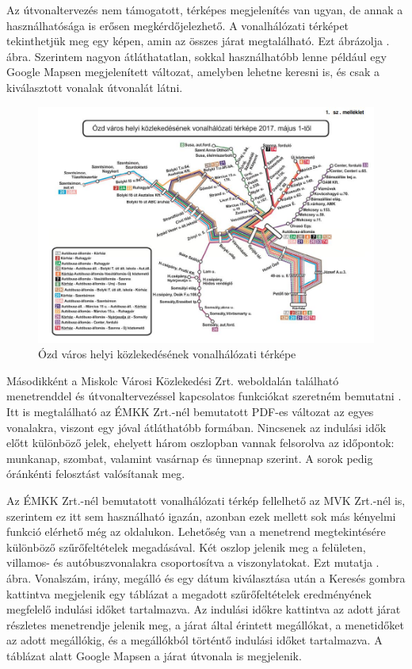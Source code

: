 Az útvonaltervezés nem támogatott, térképes megjelenítés van ugyan, de annak a használhatósága is erősen megkérdőjelezhető. A vonalhálózati térképet tekinthetjük meg egy képen, amin az összes járat megtalálható. Ezt ábrázolja . ábra. Szerintem nagyon átláthatatlan, sokkal használhatóbb lenne például egy Google Mapsen megjelenített változat, amelyben lehetne keresni is, és csak a kiválasztott vonalak útvonalát látni.

\begin{figure}[h!]
\centering
\includegraphics[scale=0.6]{kepek/EMKK_vonalhalozat.jpg}
\caption{Ózd város helyi közlekedésének vonalhálózati térképe}
\label{fig:EMKK_vonalhalozat}
\end{figure}

Másodikként a Miskolc Városi Közlekedési Zrt. weboldalán található menetrenddel és útvonaltervezéssel kapcsolatos funkciókat szeretném bemutatni \cite{mvk}. Itt is megtalálható az ÉMKK Zrt.-nél bemutatott PDF-es változat az egyes vonalakra, viszont egy jóval átláthatóbb formában. Nincsenek az indulási idők előtt különböző jelek, ehelyett három oszlopban vannak felsorolva az időpontok: munkanap, szombat, valamint vasárnap és ünnepnap szerint. A sorok pedig óránkénti felosztást valósítanak meg.

Az ÉMKK Zrt.-nél bemutatott vonalhálózati térkép fellelhető az MVK Zrt.-nél is, szerintem ez itt sem használható igazán, azonban ezek mellett sok más kényelmi funkció elérhető még az oldalukon. Lehetőség van a menetrend megtekintésére különböző szűrőfeltételek megadásával. Két oszlop jelenik meg a felületen, villamos- és autóbuszvonalakra csoportosítva a viszonylatokat. Ezt mutatja . ábra. Vonalszám, irány, megálló és egy dátum kiválasztása után a Keresés gombra kattintva megjelenik egy táblázat a megadott szűrőfeltételek eredményének megfelelő indulási időket tartalmazva. Az indulási időkre kattintva az adott járat részletes menetrendje jelenik meg, a járat által érintett megállókat, a menetidőket az adott megállókig, és a megállókból történtő indulási időket tartalmazva. A táblázat alatt Google Mapsen a járat útvonala is megjelenik.

